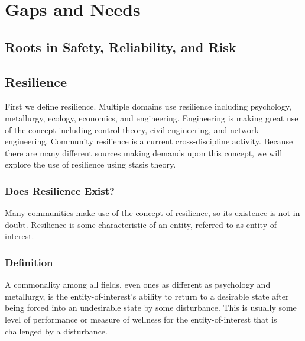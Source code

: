 
\renewcommand{\thechapter}{2}

\chapter{Gaps and Needs}

\section{Roots in Safety, Reliability, and Risk}

\section{Resilience}
First we define resilience. Multiple domains use resilience including
psychology, metallurgy, ecology, economics, and
engineering. Engineering is making great use of the concept including
control theory, civil engineering, and network engineering. Community
resilience is a current cross-discipline activity. Because there are
many different sources making demands upon this concept, we will
explore the use of resilience using stasis theory.

\subsection{Does Resilience Exist?}

Many communities make use of the concept of resilience, so its
existence is not in doubt. Resilience is some characteristic of an
entity, referred to as entity-of-interest. 

\subsection{Definition}

A commonality among all fields, even ones as different as
psychology and metallurgy, is the entity-of-interest's ability to
return to a desirable state after being forced into an undesirable
state by some disturbance. This is usually some level of performance
or measure of wellness for the entity-of-interest that is challenged
by a disturbance.


